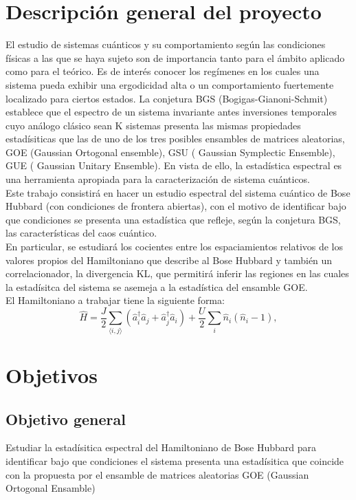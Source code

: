 \documentclass[spanish,titlepage,table]{practicas}
\begin{document}
\section{Descripción general del proyecto}\label{sec:description}
El estudio de sistemas cuánticos y su comportamiento según las condiciones físicas a las que se haya sujeto 
son de importancia tanto para el ámbito aplicado como para el teórico. Es de interés conocer los regímenes 
en los cuales una sistema pueda exhibir una ergodicidad alta o un comportamiento fuertemente localizado para ciertos estados.
La conjetura BGS (Bogigas-Gianoni-Schmit) establece que el espectro de un sistema invariante antes inversiones temporales 
cuyo análogo clásico sean K sistemas presenta las mismas propiedades estadísiticas que las de uno de los 
tres posibles ensambles de matrices aleatorias, GOE (Gaussian Ortogonal ensemble), GSU ( Gaussian Symplectic Ensemble),
GUE ( Gaussian Unitary Ensemble). %
 En vista de ello, la estadística espectral es una 
herramienta apropiada para la caracterización de sistema cuánticos. \\
Este trabajo consistirá en hacer un estudio espectral del sistema cuántico de Bose Hubbard (con condiciones de frontera abiertas), con el motivo de identificar bajo que condiciones 
se presenta una estadística que refleje, según la conjetura BGS, las características del caos cuántico.\\
En particular, se estudiará los cocientes entre los espaciamientos relativos de los valores propios del Hamiltoniano que describe al Bose Hubbard 
y también un correlacionador, la divergencia KL, que permitirá inferir las regiones en las cuales la estadísitca del sistema 
se asemeja a la estadística del ensamble GOE.
\\
El Hamiltoniano a trabajar tiene la siguiente forma:
\[
\hat{H}
= \frac{J}{2} \sum_{\langle i,j\rangle} \!\left(\hat{a}_i^{\dagger}\hat{a}_j + \hat{a}_j^{\dagger}\hat{a}_i\right)
+ \frac{U}{2}\sum_{i}\hat{n}_i(\hat{n}_i - 1),
\]
\section{Objetivos}\label{sec:objetivos}
\subsection{Objetivo general}
Estudiar la estadísitica espectral del Hamiltoniano de Bose Hubbard para identificar bajo que condiciones 
el sistema presenta una estadísitica  que coincide con la propuesta por el ensamble de matrices aleatorias GOE (Gaussian Ortogonal Ensamble)
\end{document}
